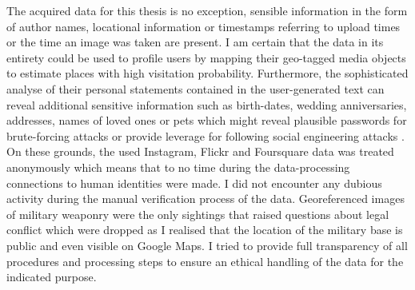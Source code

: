 The acquired data for this thesis is no exception, sensible information in the form of author names, locational information or timestamps referring to upload times or the time an image was taken are present. I am certain that the data in its entirety could be used to profile users by mapping their geo-tagged media objects to estimate places with high visitation probability. Furthermore, the sophisticated analyse of their personal statements contained in the user-generated text can reveal additional sensitive information such as birth-dates, wedding anniversaries, addresses, names of loved ones or pets which might reveal plausible passwords for brute-forcing attacks \parencite{Routh2018} or provide leverage for following social engineering attacks \parencite{Krombholz2015}. On these grounds, the used Instagram, Flickr and Foursquare data was treated anonymously which means that to no time during the data-processing connections to human identities were made. I did not encounter any dubious activity during the manual verification process of the data. Georeferenced images of military weaponry were the only sightings that raised questions about legal conflict which were dropped as I realised that the location of the military base is public and even visible on Google Maps. I tried to provide full transparency of all procedures and processing steps to ensure an ethical handling of the data for the indicated purpose.